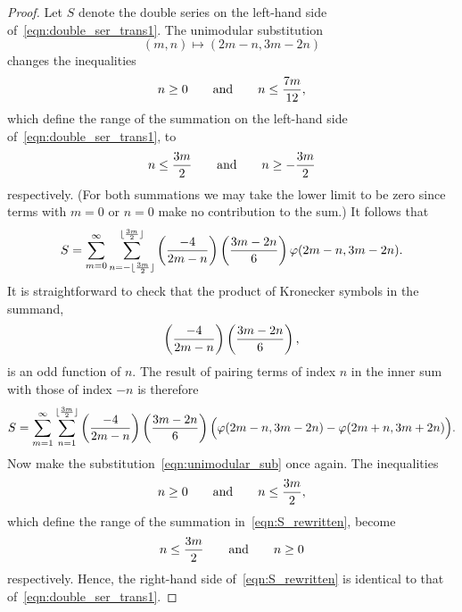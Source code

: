 \documentclass[11pt,reqno]{amsart}
\renewcommand{\=}{\;=\;}
\theoremstyle{myremark}
\begin{document}
\begin{proof}
Let $S$ denote the double series on the left-hand side of~\eqref{eqn:double_ser_trans1}. 
The unimodular substitution
\begin{equation} \label{eqn:unimodular_sub}
(m,n) \mapsto (2m-n, 3m-2n)
\end{equation}
changes the inequalities
\[ n \geq 0 \qquad \text{and} \qquad n \leq {7m \over 12}, \]
which define the range of the summation on the left-hand side of~\eqref{eqn:double_ser_trans1}, to
\[ n \leq {3m \over 2} \qquad \text{and} \qquad n \geq -{3m \over 2} \]
respectively. 
(For both summations we may take the lower limit to be zero since terms with $m=0$ or $n=0$ make no contribution to the sum.) 
It follows that
\[ S = \sum_{m=0}^\infty \sum_{n=-\lfloor {3m \over 2} \rfloor}^{\lfloor {3m \over 2} \rfloor} \left( {-4 \over 2m-n} \right) \left( {3m-2n \over 6} \right) \varphi(2m-n,3m-2n). \]
It is straightforward to check that the product of Kronecker symbols in the summand,
\[ \left( {-4 \over 2m-n} \right) \left( {3m-2n \over 6} \right), \]
is an odd function of $n$. 
The result of pairing terms of index $n$ in the inner sum with those of index $-n$ is therefore
\begin{equation} \label{eqn:S_rewritten}
S = \sum_{m=1}^\infty \sum_{n=1}^{\lfloor {3m \over 2} \rfloor} \left( {-4 \over 2m-n} \right) \left( {3m-2n \over 6} \right) \Big( \varphi(2m-n,3m-2n) - \varphi(2m+n,3m+2n) \Big).
\end{equation}
Now make the substitution~\eqref{eqn:unimodular_sub} once again. 
The inequalities
\[ n \geq 0 \qquad \text{and} \qquad n \leq {3m \over 2}, \]
which define the range of the summation in~\eqref{eqn:S_rewritten}, become
\[ n \leq {3m \over 2} \qquad \text{and} \qquad n \geq 0 \]
respectively. 
Hence, the right-hand side of~\eqref{eqn:S_rewritten} is identical to that of~\eqref{eqn:double_ser_trans1}.


\end{proof}
\end{document}
